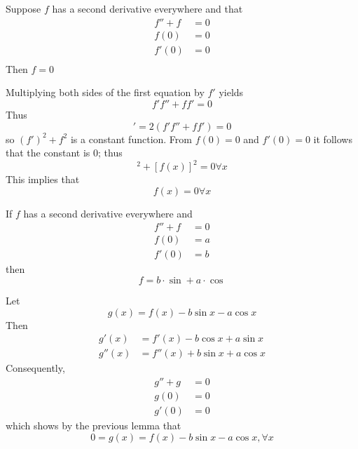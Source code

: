 \documentclass[12pt]{report}
\begin{document}
\begin{subappendices}
    \begin{lem}{}{}
        Suppose $f$ has a second derivative everywhere and that \begin{align*}
            f''+f&= 0\\
            f(0) &= 0\\
            f'(0) &= 0\\
        \end{align*}
        Then $f = 0$
    \end{lem}
    \begin{proof*}{}{}
        Multiplying both sides of the first equation by $f'$ yields \begin{equation*}
            f'f'' + ff' = 0
        \end{equation*}
        Thus \begin{equation*}
            [(f')^2+f^2]' = 2(f'f'' + ff') = 0
        \end{equation*}
        so $(f')^2+f^2$ is a constant function. From $f(0) = 0$ and $f'(0) = 0$ it follows that the constant is $0$; thus \begin{equation*}
            [f'(x)]^2+[f(x)]^2=0\forall x
        \end{equation*}
        This implies that \begin{equation*}
            f(x) = 0 \forall x
        \end{equation*}
    \end{proof*}

    \begin{thm}{}{}
        If $f$ has a second derivative everywhere and \begin{align*}
            f'' + f &= 0 \\
            f(0) &= a \\
            f'(0) &= b 
        \end{align*}
        then \begin{equation*}
            f = b\cdot \sin + a \cdot \cos
        \end{equation*}
    \end{thm}
    \begin{proof*}{}{}
        Let \begin{equation*}
            g(x) = f(x) - b\sin x - a \cos x
        \end{equation*}
        Then \begin{align*}
            g'(x) &= f'(x) - b\cos x + a \sin x \\
            g''(x) &= f''(x) + b\sin x + a\cos x
        \end{align*}
        Consequently, \begin{align*}
            g'' + g &= 0 \\
            g(0) &= 0 \\
            g'(0) &= 0
        \end{align*}
        which shows by the previous lemma that \begin{equation*}
            0 = g(x) = f(x) - b\sin x - a\cos x, \forall x
        \end{equation*}
    \end{proof*}



\end{subappendices}
\end{document}
